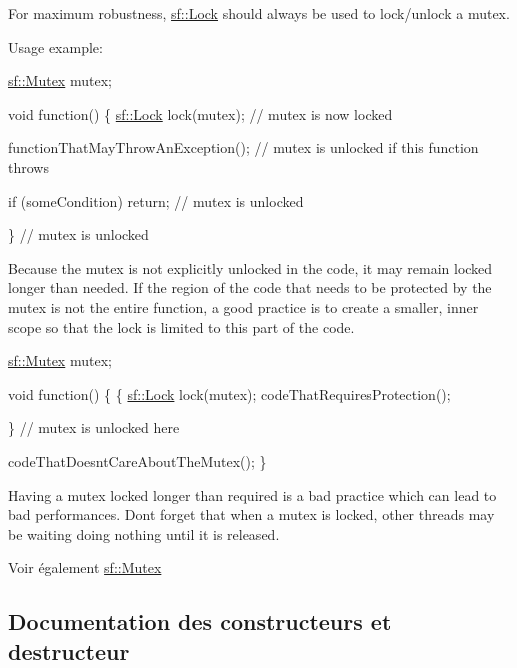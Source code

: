 For maximum robustness, \hyperlink{classsf_1_1Lock}{sf\+::\+Lock} should always be used to lock/unlock a mutex.

Usage example\+: 
\begin{DoxyCode}
\hyperlink{classsf_1_1Mutex}{sf::Mutex} mutex;

\textcolor{keywordtype}{void} \textcolor{keyword}{function}()
\{
    \hyperlink{classsf_1_1Lock}{sf::Lock} lock(mutex); \textcolor{comment}{// mutex is now locked}

    functionThatMayThrowAnException(); \textcolor{comment}{// mutex is unlocked if this function throws}

    \textcolor{keywordflow}{if} (someCondition)
        \textcolor{keywordflow}{return}; \textcolor{comment}{// mutex is unlocked}

\} \textcolor{comment}{// mutex is unlocked}
\end{DoxyCode}


Because the mutex is not explicitly unlocked in the code, it may remain locked longer than needed. If the region of the code that needs to be protected by the mutex is not the entire function, a good practice is to create a smaller, inner scope so that the lock is limited to this part of the code.


\begin{DoxyCode}
\hyperlink{classsf_1_1Mutex}{sf::Mutex} mutex;

\textcolor{keywordtype}{void} \textcolor{keyword}{function}()
\{
    \{
      \hyperlink{classsf_1_1Lock}{sf::Lock} lock(mutex);
      codeThatRequiresProtection();

    \} \textcolor{comment}{// mutex is unlocked here}

    codeThatDoesntCareAboutTheMutex();
\}
\end{DoxyCode}


Having a mutex locked longer than required is a bad practice which can lead to bad performances. Don\textquotesingle{}t forget that when a mutex is locked, other threads may be waiting doing nothing until it is released.

\begin{DoxySeeAlso}{Voir également}
\hyperlink{classsf_1_1Mutex}{sf\+::\+Mutex} 
\end{DoxySeeAlso}


\subsection{Documentation des constructeurs et destructeur}
\mbox{\label{classsf_1_1Lock_a1a4c5d7a15da61103d85c9aa7f118920}} 
